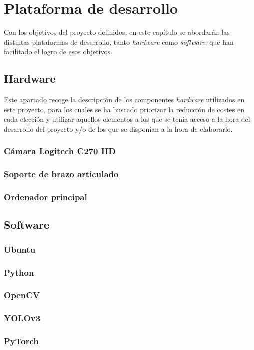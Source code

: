 \chapter{Plataforma de desarrollo}
\label{cap:capitulo4}

Con los objetivos del proyecto definidos, en este capítulo se abordarán las distintas plataformas de desarrollo, tanto \textit{hardware} como \textit{software}, que han facilitado el logro de esos objetivos.

\section{Hardware}
\label{sec:hardware}

Este apartado recoge la descripción de los componentes \textit{hardware} utilizados en este proyecto, para los cuales se ha buscado priorizar la reducción de costes en cada elección y utilizar aquellos elementos a los que se tenía acceso a la hora del desarrollo del proyecto y/o de los que se disponían a la hora de elaborarlo.

\subsection{Cámara Logitech C270 HD}
\label{subsec:logiC270HD}

\subsection{Soporte de brazo articulado}
\label{subsec:soporte}

\subsection{Ordenador principal}
\label{subsec:ordenador}

\section{Software}
\label{sec:software}

\subsection{Ubuntu}
\label{sec:ubuntu}

\subsection{Python}
\label{sec:python}

\subsection{OpenCV}
\label{sec:OpenCV}

\subsection{YOLOv3}
\label{sec:YOLOv3}

\subsection{PyTorch}
\label{sec:PyTorch}
